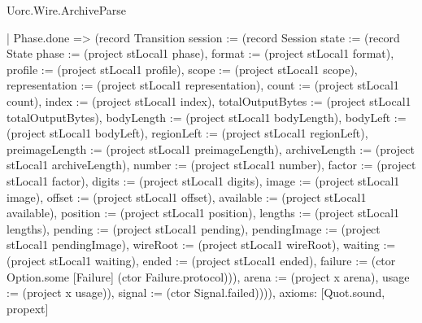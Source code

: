 \begin{lexlean}{Uorc.Wire.ArchiveParse}
\begin{semanticmodule}
{    | Phase.done => (record Transition {session := (record Session {state := (record State {phase := (project stLocal1 phase), format := (project stLocal1 format), profile := (project stLocal1 profile), scope := (project stLocal1 scope), representation := (project stLocal1 representation), count := (project stLocal1 count), index := (project stLocal1 index), totalOutputBytes := (project stLocal1 totalOutputBytes), bodyLength := (project stLocal1 bodyLength), bodyLeft := (project stLocal1 bodyLeft), regionLeft := (project stLocal1 regionLeft), preimageLength := (project stLocal1 preimageLength), archiveLength := (project stLocal1 archiveLength), number := (project stLocal1 number), factor := (project stLocal1 factor), digits := (project stLocal1 digits), image := (project stLocal1 image), offset := (project stLocal1 offset), available := (project stLocal1 available), position := (project stLocal1 position), lengths := (project stLocal1 lengths), pending := (project stLocal1 pending), pendingImage := (project stLocal1 pendingImage), wireRoot := (project stLocal1 wireRoot), waiting := (project stLocal1 waiting), ended := (project stLocal1 ended), failure := (ctor Option.some [Failure] (ctor Failure.protocol))}), arena := (project x arena), usage := (project x usage)}), signal := (ctor Signal.failed)}))),
  axioms: [Quot.sound, propext]
}


\end{semanticmodule}
\end{lexlean}

